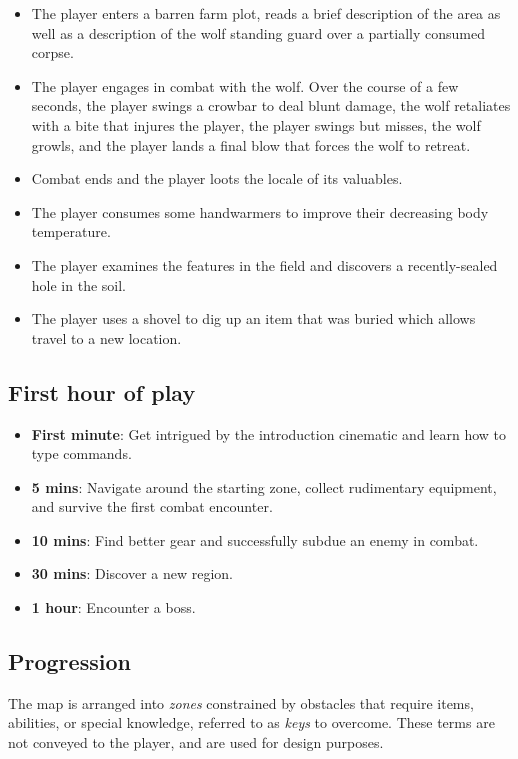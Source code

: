 \documentclass[11pt]{article}
\begin{document}
	\begin{itemize}
		\item The player enters a barren farm plot, reads a brief description of the area as well as a description of the wolf standing guard over a partially consumed corpse.
		\item The player engages in combat with the wolf. Over the course of a few seconds, the player swings a crowbar to deal blunt damage, the wolf retaliates with a bite that injures the player, the player swings but misses, the wolf growls, and the player lands a final blow that forces the wolf to retreat.
		\item Combat ends and the player loots the locale of its valuables.
		\item The player consumes some handwarmers to improve their decreasing body temperature.
		\item The player examines the features in the field and discovers a recently-sealed hole in the soil.
		\item The player uses a shovel to dig up an item that was buried which allows travel to a new location.
	\end{itemize}
	
	\subsection{First hour of play}
	
	\begin{itemize}
		\item\textbf{First minute}: Get intrigued by the introduction cinematic and learn how to type commands.
		\item\textbf{5 mins}: Navigate around the starting zone, collect rudimentary equipment, and survive the first combat encounter.
		\item\textbf{10 mins}: Find better gear and successfully subdue an enemy in combat.
		\item\textbf{30 mins}: Discover a new region.
		\item\textbf{1 hour}: Encounter a boss.
	\end{itemize}

	\subsection{Progression}
	
	The map is arranged into \textit{zones} constrained by obstacles that require items, abilities, or special knowledge, referred to as \textit{keys} to overcome. These terms are not conveyed to the player, and are used for design purposes.
	
\end{document}

